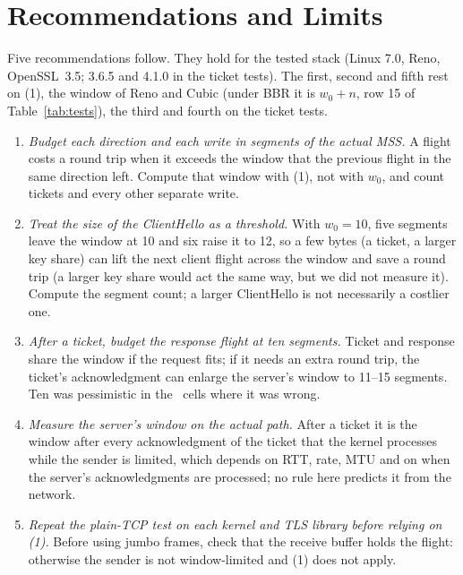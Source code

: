 \documentclass[sigconf,9pt,nonacm]{acmart}
\begin{document}
\section{Recommendations and Limits}
Five recommendations follow. They hold for the tested stack (Linux 7.0, Reno, OpenSSL~3.5; 3.6.5 and 4.1.0 in the ticket tests). The first, second and fifth rest on (1), the window of Reno and Cubic (under BBR it is $w_0+n$, row 15 of Table~\ref{tab:tests}), the third and fourth on the ticket tests.
\begin{enumerate}
\item \emph{Budget each direction and each write in segments of the actual MSS.} A flight costs a round trip when it exceeds the window that the previous flight in the same direction left. Compute that window with (1), not with $w_0$, and count tickets and every other separate write.
\item \emph{Treat the size of the ClientHello as a threshold.} With $w_0=10$, five segments leave the window at 10 and six raise it to 12, so a few bytes (a ticket, a larger key share) can lift the next client flight across the window and save a round trip (a larger key share would act the same way, but we did not measure it). Compute the segment count; a larger ClientHello is not necessarily a costlier one.
\item \emph{After a ticket, budget the response flight at ten segments.} Ticket and response share the window if the request fits; if it needs an extra round trip, the ticket's acknowledgment can enlarge the server's window to 11--15 segments. Ten was pessimistic in the \DBothWrong\ cells where it was wrong.
\item \emph{Measure the server's window on the actual path.} After a ticket it is the window after every acknowledgment of the ticket that the kernel processes while the sender is limited, which depends on RTT, rate, MTU and on when the server's acknowledgments are processed; no rule here predicts it from the network.
\item \emph{Repeat the plain-TCP test on each kernel and TLS library before relying on (1).} Before using jumbo frames, check that the receive buffer holds the flight: otherwise the sender is not window-limited and (1) does not apply.
\end{enumerate}
\end{document}
